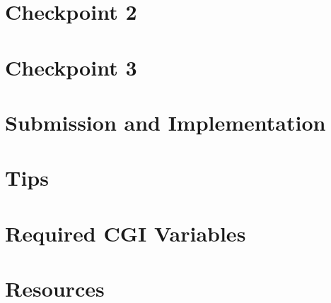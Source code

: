\documentclass{article}
\begin{document}
\newpage
\section{Checkpoint 2}


\newpage
\section{Checkpoint 3}


\newpage
\section{Submission and Implementation}



\newpage
\section{Tips}


\appendix


\newpage
\section{Required CGI Variables}


\newpage
\section{Resources}

\newpage

\end{document}
